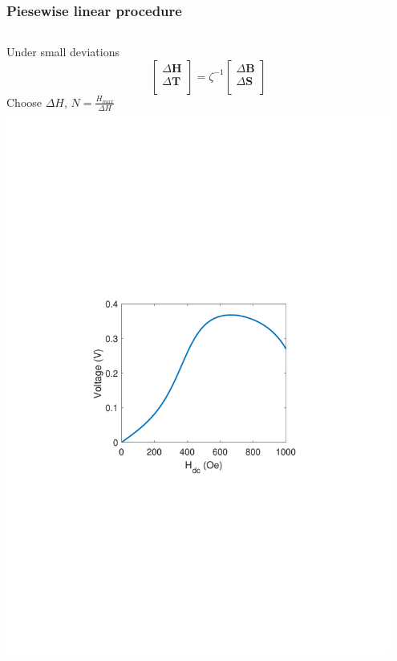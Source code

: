 \documentclass[compress]{beamer}
\begin{document}
\begin{frame}\frametitle{Piesewise linear procedure}
\begin{columns}[totalwidth=\textwidth] 
	\begin{column}{.5\textwidth} 
  Under small deviations
  \begin{equation*}
\begin{bmatrix}
       \Delta\boldsymbol{H} \\[0.3em]
       \Delta\boldsymbol{T} \\[0.3em]
\end{bmatrix} 
=\zeta^{-1}
\begin{bmatrix}
       \Delta\boldsymbol{B} \\[0.3em]
       \Delta\boldsymbol{S} \\[0.3em]
\end{bmatrix} 
	\end{equation*}
	Choose $\Delta H$, $N = \frac{H_{max}}{\Delta H}$
	\includegraphics[width=0.95\textwidth]{Graphic/02_piecewise.pdf}

\end{column}
\end{columns}
\end{frame}
\end{document}
